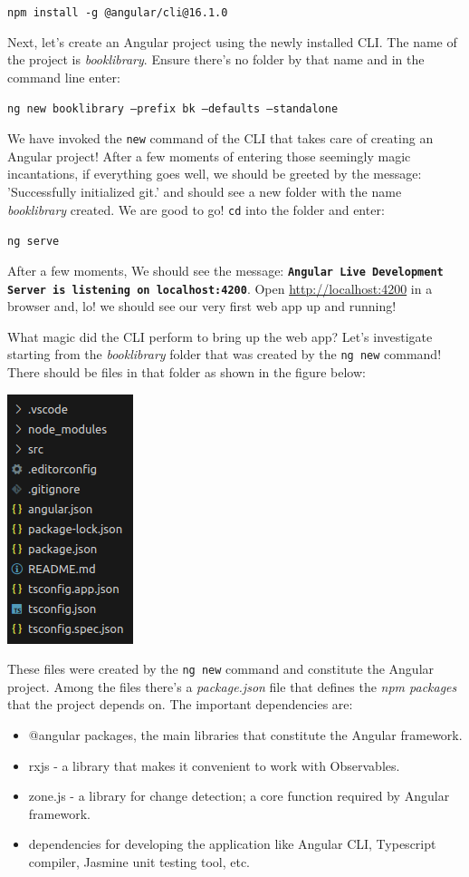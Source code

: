\documentclass[10pt]{•}\documentclass{report}
\begin{document}
\texttt{npm install -g @angular/cli@16.1.0}

Next, let's create an Angular project using the newly installed CLI. The name of the project is \textsl{booklibrary}. Ensure there's no folder by that name and in the command line enter: 

\texttt{ng new booklibrary --prefix bk --defaults --standalone}

We have invoked the \verb|new| command of the CLI that takes care of creating an Angular project! After a few moments of entering those seemingly magic incantations, if everything goes well, we should be greeted by the message: 'Successfully initialized git.' and should see a new folder with the name \textsl{booklibrary} created. We are good to go! \verb|cd| into the folder and enter:

\texttt{ng serve}

After a few moments, We should see the message: \textbf{\texttt{Angular Live Development Server is listening on localhost:4200}}. Open \url{http://localhost:4200} in a browser and, lo! we should see our very first web app up and running!

What magic did the CLI perform to bring up the web app? Let's investigate starting from the \textsl{booklibrary} folder that was created by the \verb|ng new| command! There should be files in that folder as shown in the figure below:

\includegraphics[scale=0.5]{project-structure}

These files were created by the \verb|ng new| command and constitute the Angular project. Among the files there's a \textsl{package.json} file that defines the \textsl{npm packages} that the project depends on. The important dependencies are:

\begin{itemize}
	\item @angular packages, the main libraries that constitute the Angular framework.
	\item rxjs - a library that makes it convenient to work with Observables.
	\item zone.js - a library for change detection; a core function required by Angular framework.
	\item dependencies for developing the application like Angular CLI, Typescript compiler, Jasmine unit testing tool, etc.
\end{itemize}
\end{document}
